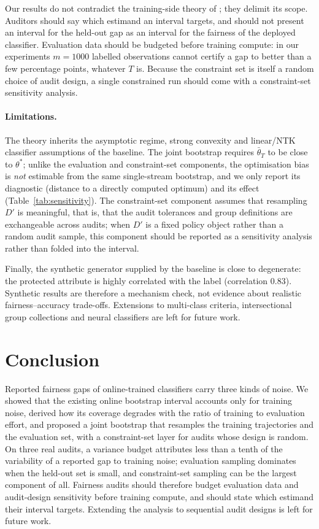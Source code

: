 \documentclass[11pt]{article}
\newcommand{\tbar}{\bar\theta}
\newcommand{\Dp}{D'}
\begin{document}
Our results do not contradict the training-side theory of \citet{roy2026uq}; they delimit its scope.
Auditors should say which estimand an interval targets, and should not present an interval for the
held-out gap as an interval for the fairness of the deployed classifier.  Evaluation data should be
budgeted before training compute: in our experiments $m=1000$ labelled observations cannot certify a
gap to better than a few percentage points, whatever $T$ is.  Because the constraint set is itself a
random choice of audit design, a single constrained run should come with a constraint-set sensitivity
analysis.

\paragraph{Limitations.}
The theory inherits the asymptotic regime, strong convexity and linear/NTK classifier assumptions of
the baseline.  The joint bootstrap requires $\tbar_T$ to be close to $\theta^*$; unlike the evaluation
and constraint-set components, the optimisation bias is \emph{not} estimable from the same
single-stream bootstrap, and we only report its diagnostic (distance to a directly computed optimum)
and its effect (Table~\ref{tab:sensitivity}).  The constraint-set component assumes that resampling
$\Dp$ is meaningful, that is, that the audit tolerances and group definitions are exchangeable across
audits; when $\Dp$ is a fixed policy object rather than a random audit sample, this component should
be reported as a sensitivity analysis rather than folded into the interval.

Finally, the synthetic generator supplied by the baseline is close to degenerate: the protected
attribute is highly correlated with the label (correlation $0.83$).  Synthetic results are therefore a
mechanism check, not evidence about realistic fairness--accuracy trade-offs.  Extensions to multi-class criteria, intersectional group
collections and neural classifiers are left for future work.

\section{Conclusion}
\label{sec:conclusion}
Reported fairness gaps of online-trained classifiers carry three kinds of noise.  We showed that the
existing online bootstrap interval accounts only for training noise, derived how its coverage degrades
with the ratio of training to evaluation effort, and proposed a joint bootstrap that resamples the
training trajectories and the evaluation set, with a constraint-set layer for audits whose design is
random.  On three real audits, a variance budget attributes less than a tenth of the variability of a
reported gap to training noise; evaluation sampling dominates when the held-out set is small, and
constraint-set sampling can be the largest component of all.  Fairness audits should therefore budget
evaluation data and audit-design sensitivity before training compute, and should state which estimand
their interval targets.  Extending the analysis to sequential audit designs is left for future work.
\end{document}
